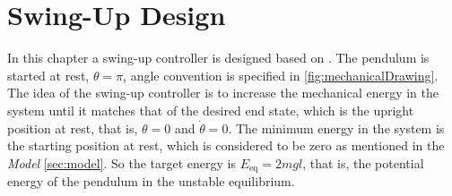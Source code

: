 \chapter{Swing-Up Design}\label{sec:swing-upDesign}
In this chapter a swing-up controller is designed based on \cite{kjAastrom}. The pendulum is started at rest, $\theta = \pi$, angle convention is specified in \autoref{fig:mechanicalDrawing}. The idea of the swing-up controller is to increase the mechanical energy in the system until it matches that of the desired end state, which is the upright position at rest, that is, $\theta = 0$ and $\dot{\theta} = 0$. The minimum energy in the system is the starting position at rest, which is considered to be zero as mentioned in the \textit{Model} \autoref{sec:model}. So the target energy is $E_{\mathrm{eq}} = 2 m g l$, that is, the potential energy of the pendulum in the unstable equilibrium.


